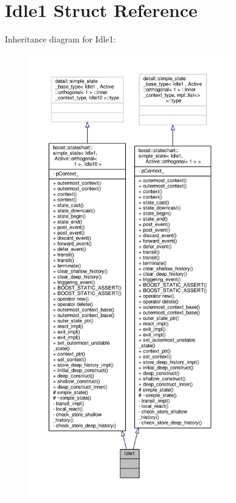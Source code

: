 \hypertarget{struct_idle1}{}\section{Idle1 Struct Reference}
\label{struct_idle1}


Inheritance diagram for Idle1\+:
\nopagebreak
\begin{figure}[H]
\begin{center}
\leavevmode
\includegraphics[height=550pt]{struct_idle1__inherit__graph}
\end{center}
\end{figure}


